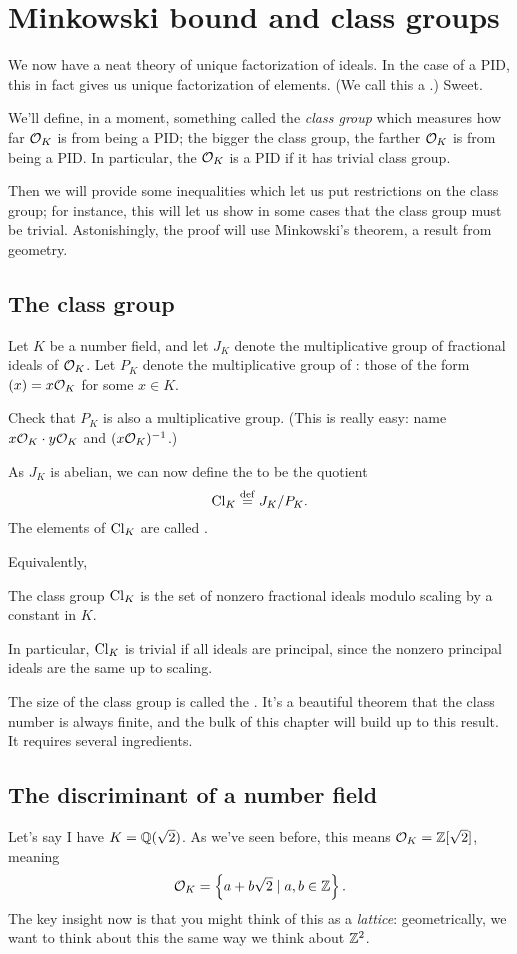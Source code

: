 \chapter{Minkowski bound and class groups}
We now have a neat theory of unique factorization of ideals.
In the case of a PID, this in fact gives us unique factorization of elements.
(We call this a .)
Sweet.

We'll define, in a moment, something called the \emph{class group}
which measures how far $\mathcal O_K$ is from being a PID;
the bigger the class group, the farther $\mathcal O_K$ is from being a PID.
In particular, the $\mathcal O_K$ is a PID if it has trivial class group.

Then we will provide some inequalities which let us put restrictions on the class group;
for instance, this will let us show in some cases that the class group must be trivial.
Astonishingly, the proof will use Minkowski's theorem, a result from geometry.

\section{The class group}
Let $K$ be a number field,
and let $J_K$ denote the multiplicative group of fractional ideals of $\mathcal O_K$.
Let $P_K$ denote the multiplicative group of :
those of the form $(x) = x \mathcal O_K$ for some $x \in K$.
\begin{ques}
Check that $P_K$ is also a multiplicative group.
(This is really easy: name $x\mathcal O_K \cdot y\mathcal O_K$ and $(x\mathcal O_K)^{-1}$.)
\end{ques}
As $J_K$ is abelian, we can now define the  to be the quotient
\[ \mathrm{Cl}_K \overset{\mathrm{def}}{=} J_K / P_K. \]
The elements of $\mathrm{Cl}_K$ are called .

Equivalently,
\begin{moral}
The class group $\mathrm{Cl}_K$ is the set of nonzero fractional ideals modulo
scaling by a constant in $K$.
\end{moral}
In particular, $\mathrm{Cl}_K$ is trivial if all ideals are principal,
since the nonzero principal ideals are the same up to scaling.

The size of the class group is called the .
It's a beautiful theorem that the class number is always finite,
and the bulk of this chapter will build up to this result.
It requires several ingredients.


\section{The discriminant of a number field}
Let's say I have $K = \mathbb Q(\sqrt 2)$.
As we've seen before, this means $\mathcal O_K = \mathbb Z[\sqrt 2]$, meaning
\[ \mathcal O_K = \left\{ a + b \sqrt 2 \mid a,b \in \mathbb Z \right\}. \]
The key insight now is that you might think of this as a \emph{lattice}:
geometrically, we want to think about this the same way we think about $\mathbb Z^2$.

